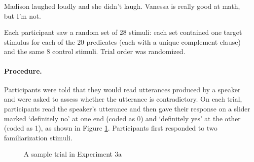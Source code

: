 \documentclass[11pt,fleqn]{article}
\newcommand{\6}{\mbox{$[\hspace*{-.6mm}[$}}
\newcommand{\9}{\mbox{$]\hspace*{-.6mm}]$}}
\begin{document}
{\begin{exe}

\ex\label{control-bad} Madison laughed loudly and she didn't laugh.
\ex\label{control-good}  Vanessa is really good at math, but I'm not.
\end{exe}

Each participant saw a random set of 28 stimuli: each set contained one target stimulus for each of the 20 predicates (each with a unique complement clause) and the same 8 control stimuli. Trial order was randomized.


\paragraph{Procedure.} Participants were told that they would read utterances produced by a speaker and were asked to assess whether the utterance is contradictory. On each trial, participants read the speaker's utterance and then gave their response on a slider marked `definitely no' at one end (coded as 0) and `definitely yes' at the other (coded as 1), as shown in Figure \ref{f-trial-exp2}. Participants first responded to two familiarization stimuli.

\begin{figure}[h!]
\begin{center}
\end{center}
\caption{A sample trial in Experiment 3a}\label{f-trial-exp2}
\end{figure}

}
\end{document}
